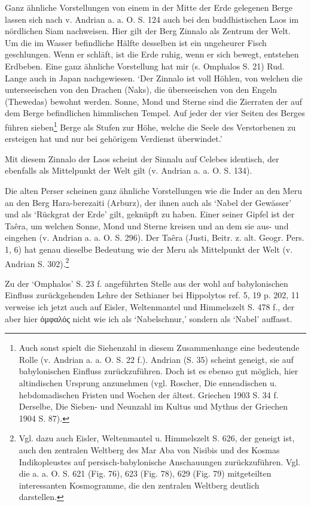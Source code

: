 \documentclass[a4paper, 11pt, oneside]{article}
\begin{document}
Ganz ähnliche Vorstellungen von einem in der Mitte der Erde gelegenen Berge lassen sich nach v. Andrian a. a. O. S. 124 auch bei den buddhistischen Laos im nördlichen Siam nachweisen. Hier gilt der Berg Zinnalo als Zentrum der Welt. Um die im Wasser befindliche Hälfte desselben ist ein ungeheurer Fisch geschlungen. Wenn er schläft, ist die Erde ruhig, wenn er sich bewegt, entstehen Erdbeben. Eine ganz ähnliche Vorstellung hat mir (s. Omphalos S. 21) Rud. Lange auch in Japan nachgewiesen. `Der Zinnalo ist voll Höhlen, von welchen die unterseeischen von den Drachen (Naks), die überseeischen von den Engeln (Thewedas) bewohnt werden. Sonne, Mond und Sterne sind die Zierraten der auf dem Berge befindlichen himmlischen Tempel. Auf jeder der vier Seiten des Berges führen sieben\footnote{Auch sonst spielt die Siehenzahl in diesem Zusammenhange eine bedeutende Rolle (v. Andrian a. a. O. S. 22 f.). Andrian (S. 35) scheint geneigt, sie auf babylonischen Einfluss zurückzuführen. Doch ist es ebenso gut möglich, hier altindischen Ursprung anzunehmen (vgl. Roscher, Die enneadischen u. hebdomadischen Fristen und Wochen der ältest. Griechen 1903 S. 34 f. Derselbe, Die Sieben- und Neunzahl im Kultus und Mythus der Griechen 1904 S. 87).} Berge als Stufen zur Höhe, welche die Seele des Verstorbenen zu ersteigen hat und nur bei gehörigem Verdienst überwindet.'

Mit diesem Zinnalo der Laos scheint der Sinnalu auf Celebes identisch, der ebenfalls als Mittelpunkt der Welt gilt (v. Andrian a. a. O. S. 134).

Die alten Perser scheinen ganz ähnliche Vorstellungen wie die Inder an den Meru an den Berg Hara-berezaiti (Arburz), der ihnen auch als `Nabel der Gewässer' und als `Rückgrat der Erde' gilt, geknüpft zu haben. Einer seiner Gipfel ist der Taêra, um welchen Sonne, Mond und Sterne kreisen und an dem sie aus- und eingehen (v. Andrian a. a. O. S. 296). Der Taêra (Justi, Beitr. z. alt. Geogr. Pers. 1, 6) hat genau dieselbe Bedeutung wie der Meru als Mittelpunkt der Welt (v. Andrian S. 302).\footnote{Vgl. dazu auch Eisler, Weltenmantel u. Himmelszelt S. 626, der geneigt ist, auch den zentralen Weltberg des Mar Aba von Nisibis und des Kosmas Indikopleustes auf persisch-babylonische Anschauungen zurückzuführen. Vgl. die a. a. O. S. 621 (Fig. 76), 623 (Fig. 78), 629 (Fig. 79) mitgeteilten interessanten Kosmogramme, die den zentralen Weltberg deutlich darstellen.}

Zu der `Omphalos' S. 23 f. angeführten Stelle aus der wohl auf babylonischen Einfluss zurückgehenden Lehre der Sethianer bei Hippolytos ref. 5, 19 p. 202, 11 verweise ich jetzt auch auf Eisler, Weltenmantel und Himmelszelt S. 478 f., der aber hier ὀμφαλός nicht wie ich als `Nabelschnur,' sondern als `Nabel' auffasst.
\end{document}
